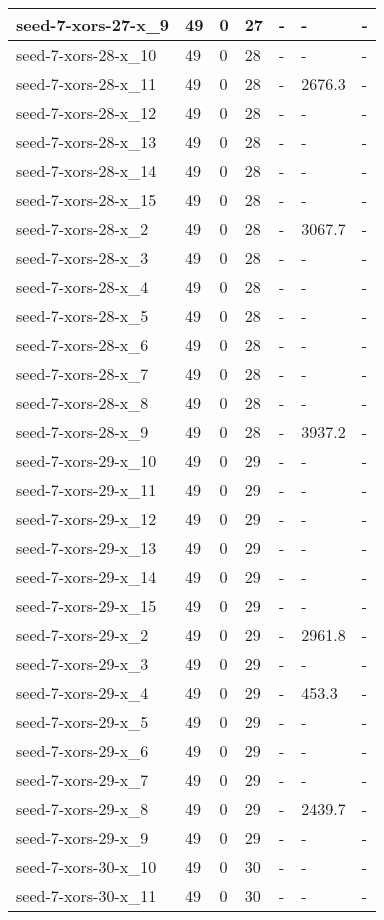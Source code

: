 \begin{scriptsize}
\begin{longtable}{|p{5cm}|l|l|l|l|l|l|}
seed-7-xors-27-x\_9&49&0&27&-&-&- \\ \hline 
seed-7-xors-28-x\_10&49&0&28&-&-&- \\ \hline 
seed-7-xors-28-x\_11&49&0&28&-&2676.3&- \\ \hline 
seed-7-xors-28-x\_12&49&0&28&-&-&- \\ \hline 
seed-7-xors-28-x\_13&49&0&28&-&-&- \\ \hline 
seed-7-xors-28-x\_14&49&0&28&-&-&- \\ \hline 
seed-7-xors-28-x\_15&49&0&28&-&-&- \\ \hline 
seed-7-xors-28-x\_2&49&0&28&-&3067.7&- \\ \hline 
seed-7-xors-28-x\_3&49&0&28&-&-&- \\ \hline 
seed-7-xors-28-x\_4&49&0&28&-&-&- \\ \hline 
seed-7-xors-28-x\_5&49&0&28&-&-&- \\ \hline 
seed-7-xors-28-x\_6&49&0&28&-&-&- \\ \hline 
seed-7-xors-28-x\_7&49&0&28&-&-&- \\ \hline 
seed-7-xors-28-x\_8&49&0&28&-&-&- \\ \hline 
seed-7-xors-28-x\_9&49&0&28&-&3937.2&- \\ \hline 
seed-7-xors-29-x\_10&49&0&29&-&-&- \\ \hline 
seed-7-xors-29-x\_11&49&0&29&-&-&- \\ \hline 
seed-7-xors-29-x\_12&49&0&29&-&-&- \\ \hline 
seed-7-xors-29-x\_13&49&0&29&-&-&- \\ \hline 
seed-7-xors-29-x\_14&49&0&29&-&-&- \\ \hline 
seed-7-xors-29-x\_15&49&0&29&-&-&- \\ \hline 
seed-7-xors-29-x\_2&49&0&29&-&2961.8&- \\ \hline 
seed-7-xors-29-x\_3&49&0&29&-&-&- \\ \hline 
seed-7-xors-29-x\_4&49&0&29&-&453.3&- \\ \hline 
seed-7-xors-29-x\_5&49&0&29&-&-&- \\ \hline 
seed-7-xors-29-x\_6&49&0&29&-&-&- \\ \hline 
seed-7-xors-29-x\_7&49&0&29&-&-&- \\ \hline 
seed-7-xors-29-x\_8&49&0&29&-&2439.7&- \\ \hline 
seed-7-xors-29-x\_9&49&0&29&-&-&- \\ \hline 
seed-7-xors-30-x\_10&49&0&30&-&-&- \\ \hline 
seed-7-xors-30-x\_11&49&0&30&-&-&- \\ \hline 

\end{longtable}
\end{scriptsize}
